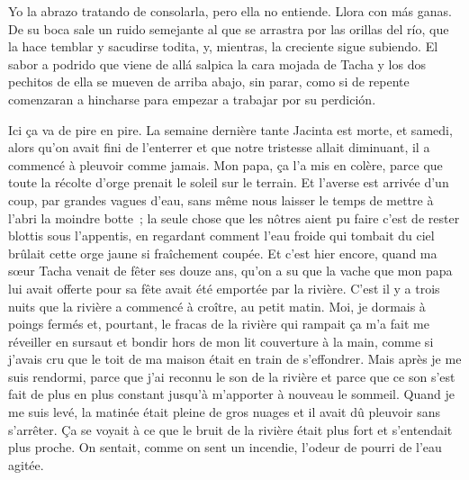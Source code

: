 \begin{pages}
\begin{Leftside}
		\pstart
			Yo la abrazo tratando de consolarla, pero ella no entiende. Llora con más ganas. De su boca sale un ruido semejante al que se arrastra por las orillas del río, que la hace temblar y sacudirse todita, y, mientras, la creciente sigue subiendo. El sabor a podrido que viene de allá salpica la cara mojada de Tacha y los dos pechitos de ella se mueven de arriba abajo, sin parar, como si de repente comenzaran a hincharse para empezar a trabajar por su perdición.
		\pend
		\endnumbering
	\end{Leftside}
	\begin{Rightside}
		\beginnumbering
			Ici ça va de pire en pire. La semaine dernière tante Jacinta est morte, et samedi, alors qu’on avait fini de l’enterrer et que notre tristesse allait diminuant, il a commencé à pleuvoir comme jamais. Mon papa, ça l’a mis en colère, parce que toute la récolte d’orge prenait le soleil sur le terrain. Et l’averse est arrivée d’un coup, par grandes vagues d’eau, sans même nous laisser le temps de mettre à l’abri la moindre botte ; la seule chose que les nôtres aient pu faire c’est de rester blottis sous l’appentis, en regardant comment l’eau froide qui tombait du ciel brûlait cette orge jaune si fraîchement coupée.
		\pend
		\pstart
			Et c’est hier encore, quand ma sœur Tacha venait de fêter ses douze ans, qu’on a su que la vache que mon papa lui avait offerte pour sa fête avait été emportée par la rivière.
		\pend
		\pstart
			C’est il y a trois nuits que la rivière a commencé à croître, au petit matin. Moi, je dormais à poings fermés et, pourtant, le fracas de la rivière qui rampait ça m’a fait me réveiller en sursaut et bondir hors de mon lit couverture à la main, comme si j’avais cru que le toit de ma maison était en train de s’effondrer. Mais après je me suis rendormi, parce que j’ai reconnu le son de la rivière et parce que ce son s’est fait de plus en plus constant jusqu’à m’apporter à nouveau le sommeil.
		\pend
		\pstart
			Quand je me suis levé, la matinée était pleine de gros nuages et il avait dû pleuvoir sans s’arrêter. Ça se voyait à ce que le bruit de la rivière était plus fort et s’entendait plus proche. On sentait, comme on sent un incendie, l’odeur de pourri de l’eau agitée.
		\pend
		\pstart

\end{Rightside}
\end{pages}
